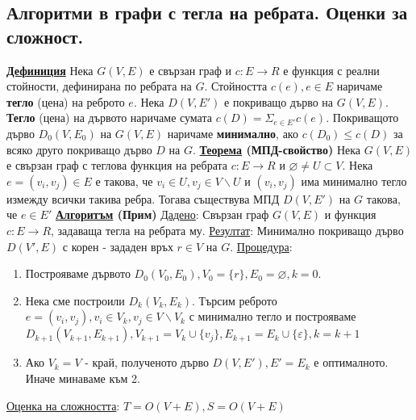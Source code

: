 \documentclass{article}
\begin{document}
\subsection*{Алгоритми в графи с тегла на ребрата. Оценки за сложност.}
\textbf{\underline{Дефиниция}}
Нека $G(V, E)$ е свързан граф и $c : E \rightarrow R$ е функция с реални стойности, дефинирана по ребрата на $G$. Стойността
$c(e), e \in E$ наричаме \textbf{тегло} (цена) на реброто $e$. Нека $D(V, E')$ е покриващо дърво на $G(V, E)$. \textbf{Тегло}
(цена) на дървото наричаме сумата $c(D) = \Sigma_{e \in E'}c(e)$. Покриващото дърво $D_0(V, E_0)$ на $G(V, E)$ наричаме
\textbf{минимално}, ако $c(D_0) \le c(D)$ за всяко друго покриващо дърво $D$ на $G$. \newline\newline
\textbf{\underline{Теорема} (МПД-свойство)} \newline
Нека $G(V, E)$ е свързан граф с теглова функция на ребрата $c : E \rightarrow R$ и $\varnothing \neq U \subset V$. Нека $e = (v_i,
v_j) \in E$ е такова, че $v_i \in U, v_j \in V \backslash U$ и $(v_i, v_j)$ има минимално тегло измежду всички такива ребра.
Тогава съществува МПД $D(V, E')$ на $G$ такова, че $e \in E'$ \newline\newline
\textbf{\underline{Алгоритъм} (Прим)} \newline\newline
\underline{Дадено}: Свързан граф $G(V, E)$ и функция $c : E \rightarrow R$, задаваща тегла на ребрата му. \newline
\underline{Резултат}: Минимално покриващо дърво $D(V', E)$ с корен - зададен връх $r \in V$ на $G$. \newline
\underline{Процедура}:
\begin{enumerate}
    \item Построяваме дървото $D_0(V_0, E_0), V_0 = \{r\}, E_0 = \varnothing, k = 0$.
    \item Нека сме построили $D_k(V_k, E_k)$. Търсим реброто $e = (v_i, v_j), v_i \in V_k, v_j \in V \backslash V_k$
    с минимално тегло и построяваме $D_{k+1}(V_{k+1}, E_{k+1}), V_{k+1} = V_k \cup \{v_j\}, E_{k+1} =
    E_k \cup \{\varepsilon\}, k = k + 1$
    \item Ако $V_k = V$ - край, полученото дърво $D(V, E'), E' = E_k$ е оптималното. Иначе минаваме към 2.
\end{enumerate}
\underline{Оценка на сложността}: $T = O(V + E), S = O(V + E)$ \newline\newline
\end{document}
